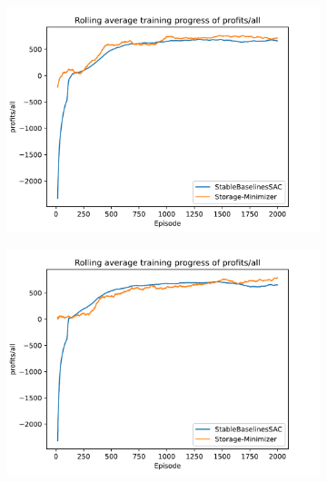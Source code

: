 \begin{figure}[!hbt]
	\centering
	\begin{subfigure}{0.49\textwidth}
		\centering
		\includegraphics[width = \textwidth]{images/experiments/SACDuopoly/SACDuopolyProfitsMean1.pdf}\\
		\label{fig:SACDuopolyProfitsMean1}
	\end{subfigure}
	\begin{subfigure}{0.49\textwidth}
		\centering
		\includegraphics[width = \textwidth]{images/experiments/SACDuopoly/SACDuopolyProfitsMean2.pdf}\\
		\label{fig:SACDuopolyProfitsMean2}
	\end{subfigure}

\end{figure}
